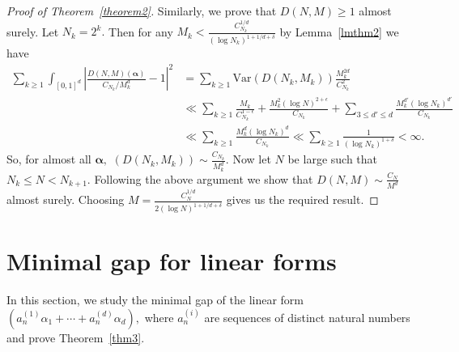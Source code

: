 \documentclass[12pt,article]{amsart}
\theoremstyle{remark}
\numberwithin{equation}{section}
\newcommand{\Var}{\text{Var}}
\newcommand{\boldalpha}{\boldsymbol{\alpha}}
\begin{document}
\begin{proof}[Proof of Theorem~\ref{theorem2}]
		
		Similarly, we prove that $D(N, M)\geq 1$ almost surely.
		Let $N_k=2^k.$ Then for any $M_k<\frac{C_{N_k}^{1/d}}{(\log N_k)^{1+1/d+\delta}}$ by Lemma~\ref{lmthm2} we have 
		\begin{align*}
			\sum_{k\geq 1}\int_{[0,1]^d}\left|\frac{D(N,M)(\boldalpha)}{C_{N_k}/M_k^d}-1\right|^2&=\sum_{k\geq 1}\Var(D(N_k,M_k))\frac{M_k^{2d}}{C_{N_k}^2}\\
			&\ll\sum_{k\geq 1}\frac{M_k}{C_{N_k}^{1-\epsilon}}+\frac{M_k^2(\log N)^{2+\epsilon}}{C_{N_k}}+\sum_{3\leq d'\leq d}\frac{M_k^{d'}(\log N_k)^{d'}}{C_{N_k}}\\
			&\ll\sum_{k\geq 1}\frac{M_k^{d}(\log N_k)^{d}}{C_{N_k}}\ll\sum_{k\geq 1}\frac{1}{(\log N_k)^{1+\delta}}<\infty.
		\end{align*}
		So, for almost all $\boldalpha,$ $(D(N_k,M_k))\sim\frac{C_{N_k}}{M_k^d}.$ Now let $N$ be large such that $N_k\leq N<N_{k+1}.$ Following the above argument we show that $D(N,M)\sim \frac{C_N}{M^d}$ almost surely. Choosing $M=\frac{C_{N}^{1/d}}{2(\log N)^{1+1/d+\delta}}$ gives us the required result.
	\end{proof}
	
	\section{Minimal gap for linear forms}
	In this section, we study the minimal gap of the linear form $({a_n^{(1)}\alpha_1+\cdots+a_n^{(d)}\alpha_d}),$ where $a_n^{(i)}$ are sequences of distinct natural numbers and prove Theorem~\ref{thm3}. 
	
\end{document}
